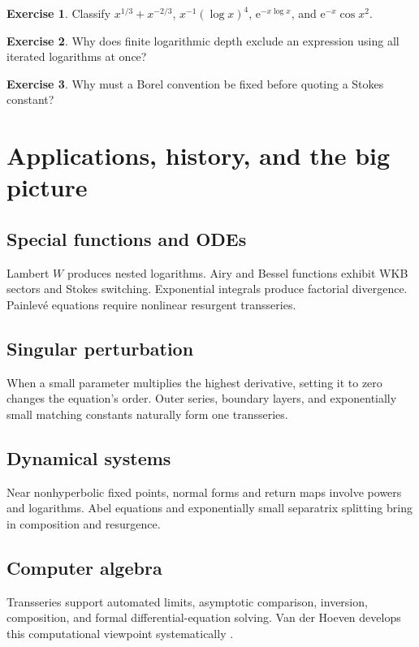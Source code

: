 \documentclass[11pt,oneside,openany]{book}
\newcommand{\e}{\mathrm{e}}
\theoremstyle{plain}
\theoremstyle{definition}
\newtheorem{exercise}{Exercise}[chapter]
\theoremstyle{remark}
\begin{document}
\begin{exercise}
Classify $x^{1/3}+x^{-2/3}$, $x^{-1}(\log x)^4$, $\e^{-x\log x}$, and $\e^{-x}\cos x^2$.
\end{exercise}

\begin{exercise}
Why does finite logarithmic depth exclude an expression using all iterated logarithms at once?
\end{exercise}

\begin{exercise}
Why must a Borel convention be fixed before quoting a Stokes constant?
\end{exercise}


\chapter{Applications, history, and the big picture}
\label{ch:applications}

\section{Special functions and ODEs}
Lambert $W$ produces nested logarithms. Airy and Bessel functions exhibit WKB sectors and Stokes switching. Exponential integrals produce factorial divergence. Painlevé equations require nonlinear resurgent transseries.

\section{Singular perturbation}
When a small parameter multiplies the highest derivative, setting it to zero changes the equation's order. Outer series, boundary layers, and exponentially small matching constants naturally form one transseries.

\section{Dynamical systems}
Near nonhyperbolic fixed points, normal forms and return maps involve powers and logarithms. Abel equations and exponentially small separatrix splitting bring in composition and resurgence.

\section{Computer algebra}
Transseries support automated limits, asymptotic comparison, inversion, composition, and formal differential-equation solving. Van der Hoeven develops this computational viewpoint systematically \cite{vdH2006}.
\end{document}
